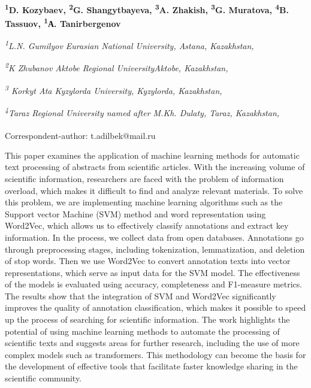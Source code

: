 
\begin{articleheader}

{\bfseries \textsuperscript{1}D. Kozybaev\authorid,
\textsuperscript{2}G. Shangytbayeva\authorid,
\textsuperscript{3}A. Zhakish\authorid,
\textsuperscript{3}G. Muratova\authorid,
\textsuperscript{4}B. Tassuov\authorid,
\textsuperscript{1}А. Tanirbergenov\textsuperscript{\envelope } \authorid}
\end{articleheader}

\begin{affiliation}
\emph{\textsuperscript{1}L.N. Gumilyov Eurasian National University, Astana, Kazakhstan,}

\emph{\textsuperscript{2}K Zhubanov Aktobe Regional UniversityAktobe, Kazakhstan,}

\emph{\textsuperscript{3} Korkyt Ata Kyzylorda University, Kyzylorda, Kazakhstan,}

\emph{\textsuperscript{4}Taraz Regional University named after M.Kh. Dulaty, Taraz, Kazakhstan,}

\raggedright \textsuperscript{\envelope }Correspondent-author: t.adilbek@mail.ru
\end{affiliation}

This paper examines the application of machine learning methods for
automatic text processing of abstracts from scientific articles. With
the increasing volume of scientific information, researchers are faced
with the problem of information overload, which makes it difficult to
find and analyze relevant materials. To solve this problem, we are
implementing machine learning algorithms such as the Support vector
Machine (SVM) method and word representation using Word2Vec, which
allows us to effectively classify annotations and extract key
information. In the process, we collect data from open databases.
Annotations go through preprocessing stages, including tokenization,
lemmatization, and deletion of stop words. Then we use Word2Vec to
convert annotation texts into vector representations, which serve as
input data for the SVM model. The effectiveness of the models is
evaluated using accuracy, completeness and F1-measure metrics. The
results show that the integration of SVM and Word2Vec significantly
improves the quality of annotation classification, which makes it
possible to speed up the process of searching for scientific
information. The work highlights the potential of using machine learning
methods to automate the processing of scientific texts and suggests
areas for further research, including the use of more complex models
such as transformers. This methodology can become the basis for the
development of effective tools that facilitate faster knowledge sharing
in the scientific community.

